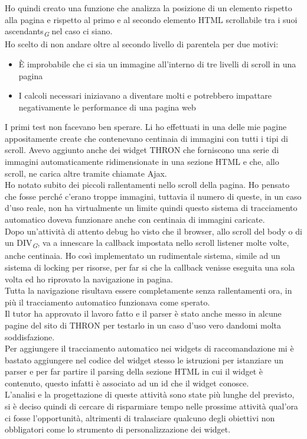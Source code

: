 \documentclass[a4paper, 12pt, twoside, openright]{book}
\newcommand{\gloss}[1]{#1\textsubscript{\textit{\tiny{G}}}}
\begin{document}
Ho quindi creato una funzione che analizza la posizione di un elemento rispetto alla pagina e rispetto al primo e al secondo elemento HTML scrollabile tra i suoi \gloss{ascendants} nel caso ci siano.\\
Ho scelto di non andare oltre al secondo livello di parentela per due motivi:
\begin{itemize}
	\item \`{E} improbabile che ci sia un immagine all'interno di tre livelli di scroll in una pagina
	\item I calcoli necessari iniziavano a diventare molti e potrebbero impattare negativamente le performance di una pagina web
\end{itemize}
I primi test non facevano ben sperare. Li ho effettuati in una delle mie pagine appositamente create che contenevano centinaia di immagini con tutti i tipi di scroll. Avevo aggiunto anche dei widget THRON che forniscono una serie di immagini automaticamente ridimensionate in una sezione HTML e che, allo scroll, ne carica altre tramite chiamate Ajax.\\
Ho notato subito dei piccoli rallentamenti nello scroll della pagina. Ho pensato che fosse perché c'erano troppe immagini, tuttavia il numero di queste, in un caso d'uso reale, non ha virtualmente un limite quindi questo sistema di tracciamento automatico doveva funzionare anche con centinaia di immagini caricate.\\
Dopo un'attività di attento debug ho visto che il browser, allo scroll del body o di un \gloss{DIV}, va a innescare la callback impostata nello scroll listener molte volte, anche centinaia. Ho così implementato un rudimentale sistema, simile ad un sistema di locking per risorse, per far si che la callback venisse eseguita una sola volta ed ho riprovato la navigazione in pagina.\\
Tutta la navigazione  risultava essere completamente senza rallentamenti ora, in più il tracciamento automatico funzionava come sperato.\\
Il tutor ha approvato il lavoro fatto e il parser è stato anche messo in alcune pagine del sito di THRON per testarlo in un caso d'uso vero dandomi molta soddisfazione.\\
Per aggiungere il tracciamento automatico nei widgets di raccomandazione mi è bastato aggiungere nel codice del widget stesso le istruzioni per istanziare un parser e per far partire il parsing della sezione HTML in cui il widget è contenuto, questo infatti è associato ad un id che il widget conosce.\\
L'analisi e la progettazione di queste attività sono state più lunghe del previsto, si è deciso quindi di cercare di risparmiare tempo nelle prossime attività qual'ora ci fosse l'opportunità, altrimenti di tralasciare qualcuno degli obiettivi non obbligatori come lo strumento di personalizzazione dei widget.
\end{document}
